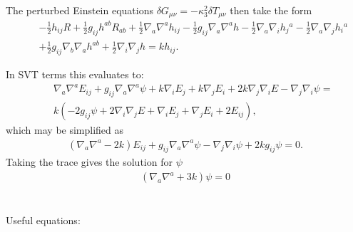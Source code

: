 \documentclass[10pt,letterpaper]{article}
\numberwithin{equation}{section}
\begin{document}
The perturbed Einstein equations  $\delta G_{\mu\nu} =-\kappa_3^2 \delta T_{\mu\nu}$ then take the form
\begin{eqnarray}
&&- \tfrac{1}{2} h_{ij} R
+ \tfrac{1}{2} g_{ij} h^{ab} R_{ab}
+ \tfrac{1}{2} \nabla_{a}\nabla^{a}h_{ij}
-  \tfrac{1}{2} g_{ij} \nabla_{a}\nabla^{a}h
-  \tfrac{1}{2} \nabla_{a}\nabla_{i}h_{j}{}^{a}
-  \tfrac{1}{2} \nabla_{a}\nabla_{j}h_{i}{}^{a}\nonumber\\
&& + \tfrac{1}{2} g_{ij} \nabla_{b}\nabla_{a}h^{ab}
+ \tfrac{1}{2} \nabla_{i}\nabla_{j}h = k h_{ij}.
\end{eqnarray}

In SVT terms this evaluates to:
\begin{eqnarray}
&&\nabla_{a}\nabla^{a}E_{ij}
 +g_{ij} \nabla_{a}\nabla^{a}\psi
 + k \nabla_{i}E_{j}
 + k \nabla_{j}E_{i}
 + 2 k \nabla_{j}\nabla_{i}E
 -  \nabla_{j}\nabla_{i}\psi =
\nonumber \\
&& k (-2 g_{ij}\psi + 2\nabla_i\nabla_j E + \nabla_i E_j + \nabla_j E_i + 2E_{ij}),
\end{eqnarray}
which may be simplified as
\begin{eqnarray}\boxed{
(\nabla_a \nabla^a-2k)E_{ij} + g_{ij}\nabla_a \nabla^a \psi - \nabla_j\nabla_i \psi+2k g_{ij}\psi = 0.
\label{dgdt}}
\end{eqnarray}
Taking the trace gives the solution for $\psi$
\begin{eqnarray}\boxed{
(\nabla_a \nabla^a + 3k)\psi = 0
\label{dgdttr}}
\end{eqnarray} 
\\ \\
Useful equations:
\end{document}
